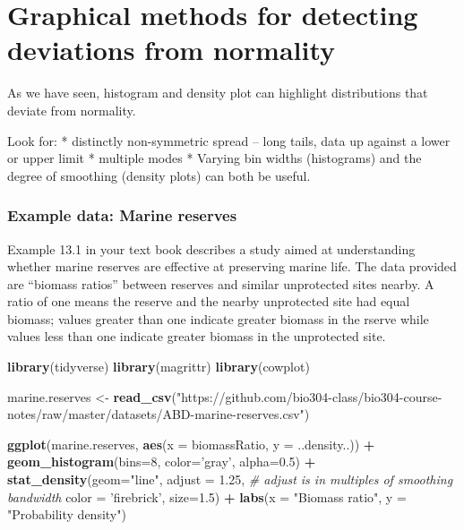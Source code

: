\documentclass[]{book}
\newenvironment{Shaded}{\begin{snugshade}}{\end{snugshade}}
\newcommand{\CommentTok}[1]{\textcolor[rgb]{0.56,0.35,0.01}{\textit{#1}}}
\newcommand{\DataTypeTok}[1]{\textcolor[rgb]{0.13,0.29,0.53}{#1}}
\newcommand{\DecValTok}[1]{\textcolor[rgb]{0.00,0.00,0.81}{#1}}
\newcommand{\FloatTok}[1]{\textcolor[rgb]{0.00,0.00,0.81}{#1}}
\newcommand{\KeywordTok}[1]{\textcolor[rgb]{0.13,0.29,0.53}{\textbf{#1}}}
\newcommand{\NormalTok}[1]{#1}
\newcommand{\OperatorTok}[1]{\textcolor[rgb]{0.81,0.36,0.00}{\textbf{#1}}}
\newcommand{\StringTok}[1]{\textcolor[rgb]{0.31,0.60,0.02}{#1}}
\theoremstyle{definition}
\theoremstyle{definition}
\theoremstyle{definition}
\theoremstyle{remark}
\begin{document}
\hypertarget{graphical-methods-for-detecting-deviations-from-normality}{%
\section{Graphical methods for detecting deviations from
normality}\label{graphical-methods-for-detecting-deviations-from-normality}}

As we have seen, histogram and density plot can highlight distributions
that deviate from normality.

Look for: * distinctly non-symmetric spread -- long tails, data up
against a lower or upper limit * multiple modes * Varying bin widths
(histograms) and the degree of smoothing (density plots) can both be
useful.

\hypertarget{example-data-marine-reserves}{%
\subsubsection*{Example data: Marine
reserves}\label{example-data-marine-reserves}}

Example 13.1 in your text book describes a study aimed at understanding
whether marine reserves are effective at preserving marine life. The
data provided are ``biomass ratios'' between reserves and similar
unprotected sites nearby. A ratio of one means the reserve and the
nearby unprotected site had equal biomass; values greater than one
indicate greater biomass in the rserve while values less than one
indicate greater biomass in the unprotected site.

\begin{Shaded}
\begin{Highlighting}[]
\KeywordTok{library}\NormalTok{(tidyverse)}
\KeywordTok{library}\NormalTok{(magrittr)}
\KeywordTok{library}\NormalTok{(cowplot)}

\NormalTok{marine.reserves <-}\StringTok{ }\KeywordTok{read_csv}\NormalTok{(}\StringTok{"https://github.com/bio304-class/bio304-course-notes/raw/master/datasets/ABD-marine-reserves.csv"}\NormalTok{)}

\KeywordTok{ggplot}\NormalTok{(marine.reserves, }\KeywordTok{aes}\NormalTok{(}\DataTypeTok{x =}\NormalTok{ biomassRatio, }\DataTypeTok{y =}\NormalTok{ ..density..)) }\OperatorTok{+}
\StringTok{  }\KeywordTok{geom_histogram}\NormalTok{(}\DataTypeTok{bins=}\DecValTok{8}\NormalTok{, }\DataTypeTok{color=}\StringTok{'gray'}\NormalTok{, }\DataTypeTok{alpha=}\FloatTok{0.5}\NormalTok{) }\OperatorTok{+}\StringTok{ }
\StringTok{  }\KeywordTok{stat_density}\NormalTok{(}\DataTypeTok{geom=}\StringTok{"line"}\NormalTok{,}
               \DataTypeTok{adjust =} \FloatTok{1.25}\NormalTok{,   }\CommentTok{# adjust is in multiples of smoothing bandwidth}
               \DataTypeTok{color =} \StringTok{'firebrick'}\NormalTok{, }\DataTypeTok{size=}\FloatTok{1.5}\NormalTok{) }\OperatorTok{+}
\StringTok{  }\KeywordTok{labs}\NormalTok{(}\DataTypeTok{x =} \StringTok{"Biomass ratio"}\NormalTok{, }\DataTypeTok{y =} \StringTok{"Probability density"}\NormalTok{)}
\end{Highlighting}
\end{Shaded}
\end{document}
